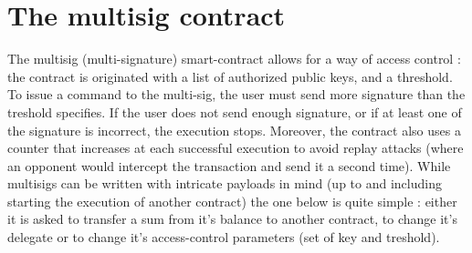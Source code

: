 \documentclass{report}
\begin{document}
\section{The multisig contract}
\label{appendix:multisigAlbert}

The multisig (multi-signature) smart-contract allows for a way of access control : the contract is originated with a list of authorized public keys, and a threshold. To issue a command to the multi-sig, the user must send more signature than the treshold specifies. If the user does not send enough signature, or if at least one of the signature is incorrect, the execution stops. Moreover, the contract also uses a counter that increases at each successful execution to avoid replay attacks (where an opponent would intercept the transaction and send it a second time). While multisigs can be written with intricate payloads in mind (up to and including starting the execution of another contract) the one below is quite simple : either it is asked to transfer a sum from it's balance to another contract, to change it's delegate or to change it's access-control parameters (set of key and treshold).
\end{document}
